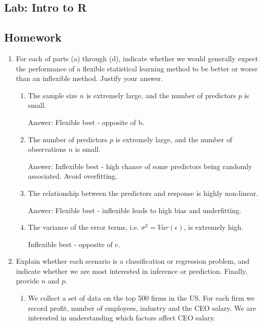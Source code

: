 \documentclass{article}
\begin{document}
\subsection*{Lab: Intro to R}

\subsection*{Homework}

\begin{enumerate}
\item For each of parts (a) through (d), indicate whether we would generally expect 
the performance of a flexible statistical learning method to be better or
worse than an inflexible method. Justify your answer.
\begin{enumerate}

\item The sample size $n$ is extremely large, and the number of predictors $p$ is small.

Answer: Flexible best - opposite of b.

\item The number of predictors $p$ is extremely large, and the number of observations $n$ is small.

Answer: Inflexible best - high chance of some predictors being randomly associated. Avoid overfitting.

\item The relationship between the predictors and response is highly non-linear.

Answer: Flexible best - inflexible leads to high bias and underfitting.

\item The variance of the error terms, i.e. $\sigma^2 = Var(\epsilon)$, is extremely high.

Inflexible best - opposite of c. 
\end{enumerate}

\item Explain whether each scenario is a classification or regression problem, and
 indicate whether we are most interested in inference or prediction. Finally,
 provide $n$ and $p$.
\begin{enumerate}
\item We collect a set of data on the top 500 firms in the US. For each firm
    we record profit, number of employees, industry and the CEO salary. We are
    interested in understanding which factors affect CEO salary.


\end{enumerate}
\end{enumerate}
\end{document}
